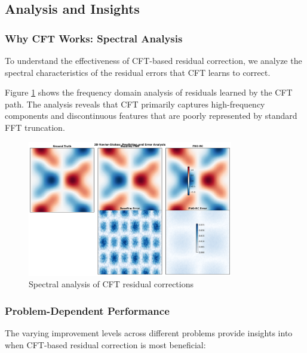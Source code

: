 \documentclass[11pt]{article}
\begin{document}
\subsection{Analysis and Insights}

\subsubsection{Why CFT Works: Spectral Analysis}

To understand the effectiveness of CFT-based residual correction, we analyze the spectral characteristics of the residual errors that CFT learns to correct.

Figure \ref{fig:spectral} shows the frequency domain analysis of residuals learned by the CFT path. The analysis reveals that CFT primarily captures high-frequency components and discontinuous features that are poorly represented by standard FFT truncation.

\begin{figure}[h]
\centering
\includegraphics[width=0.8\textwidth]{figures/cft_analysis.png}
\caption{Spectral analysis of CFT residual corrections}
\label{fig:spectral}
\end{figure}

\subsubsection{Problem-Dependent Performance}

The varying improvement levels across different problems provide insights into when CFT-based residual correction is most beneficial:
\end{document}
